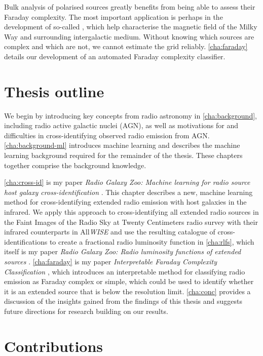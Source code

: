     Bulk analysis of polarised sources greatly benefits from being able to assess their Faraday complexity. The most important application is perhaps in the development of so-called , which help characterise the magnetic field of the Milky Way and surrounding intergalactic medium. Without knowing which sources are complex and which are not, we cannot estimate the grid reliably. \autoref{cha:faraday} details our development of an automated Faraday complexity classifier.

\section{Thesis outline}
\label{sec:outline}

We begin by introducing key concepts from radio astronomy in \autoref{cha:background}, including radio active galactic nuclei (AGN), as well as motivations for and difficulties in cross-identifying observed radio emission from AGN. \autoref{cha:background-ml} introduces machine learning and describes the machine learning background required for the remainder of the thesis. These chapters together comprise the background knowledge.

\autoref{cha:cross-id} is my paper \emph{Radio Galaxy Zoo: Machine learning for radio source host galaxy cross-identification} \citep{alger18radio}. This chapter describes a new, machine learning method for cross-identifying extended radio emission with host galaxies in the infrared. We apply this approach to cross-identifying all extended radio sources in the Faint Images of the Radio Sky at Twenty Centimeters radio survey \citep[FIRST;][]{becker95first} with their infrared counterparts in All\emph{WISE} \citep{cutri2013wiseexplanatory} and use the resulting catalogue of cross-identifications to create a fractional radio luminosity function in \autoref{cha:rlfs}, which itself is my paper \emph{Radio Galaxy Zoo: Radio luminosity functions of extended sources} \citep{alger21rlfs}. \autoref{cha:faraday} is my paper \emph{Interpretable Faraday Complexity Classification} \citep{alger2021interpretable}, which introduces an interpretable method for classifying radio emission as Faraday complex or simple, which could be used to identify whether it is an extended source that is below the resolution limit. \autoref{cha:conc} provides a discussion of the insights gained from the findings of this thesis and suggests future directions for research building on our results.

\section{Contributions}
\label{sec:contributions}

